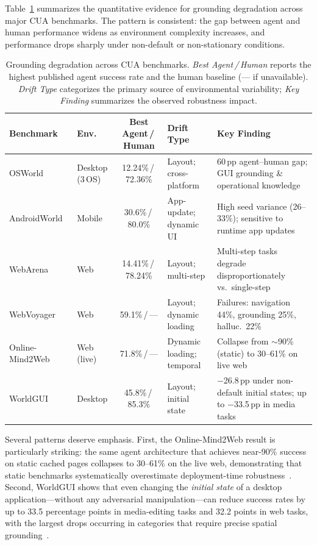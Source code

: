 Table~\ref{tab:grounding-degradation} summarizes the quantitative evidence for grounding degradation across major CUA benchmarks. The pattern is consistent: the gap between agent and human performance widens as environment complexity increases, and performance drops sharply under non-default or non-stationary conditions.

\begin{table}[!ht]
\caption{Grounding degradation across CUA benchmarks. \emph{Best Agent\,/\,Human} reports the highest published agent success rate and the human baseline (--- if unavailable). \emph{Drift Type} categorizes the primary source of environmental variability; \emph{Key Finding} summarizes the observed robustness impact.}
\label{tab:grounding-degradation}
\centering
\footnotesize
\setlength{\tabcolsep}{4pt}
\begin{tabular}{p{2.4cm} p{1.3cm} c p{1.8cm} p{3.8cm}}
\toprule
\textbf{Benchmark} & \textbf{Env.} & \textbf{Best Agent\,/\,Human} & \textbf{Drift Type} & \textbf{Key Finding} \\
\midrule
OSWorld~\cite{osworld2024}
  & Desktop (3\,OS)
  & 12.24\%\,/\,72.36\%
  & Layout; cross-platform
  & 60\,pp agent--human gap; GUI grounding \& operational knowledge \\
\midrule
AndroidWorld~\cite{androidworld2024}
  & Mobile
  & 30.6\%\,/\,80.0\%
  & App-update; dynamic UI
  & High seed variance (26--33\%); sensitive to runtime app updates \\
\midrule
WebArena~\cite{webarena2023}
  & Web
  & 14.41\%\,/\,78.24\%
  & Layout; multi-step
  & Multi-step tasks degrade disproportionately vs.\ single-step \\
\midrule
WebVoyager~\cite{webvoyager2024}
  & Web
  & 59.1\%\,/\,---
  & Layout; dynamic loading
  & Failures: navigation 44\%, grounding 25\%, halluc.\ 22\% \\
\midrule
Online-Mind2Web~\cite{onlinemind2web2025}
  & Web (live)
  & 71.8\%\,/\,---
  & Dynamic loading; temporal
  & Collapse from ${\sim}$90\% (static) to 30--61\% on live web \\
\midrule
WorldGUI~\cite{worldgui2025}
  & Desktop
  & 45.8\%\,/\,85.3\%
  & Layout; initial state
  & $-$26.8\,pp under non-default initial states; up to $-$33.5\,pp in media tasks \\
\bottomrule
\end{tabular}
\end{table}

Several patterns deserve emphasis. First, the Online-Mind2Web result is particularly striking: the same agent architecture that achieves near-90\% success on static cached pages collapses to 30--61\% on the live web, demonstrating that static benchmarks systematically overestimate deployment-time robustness~\cite{onlinemind2web2025}. Second, WorldGUI shows that even changing the \emph{initial state} of a desktop application---without any adversarial manipulation---can reduce success rates by up to 33.5 percentage points in media-editing tasks and 32.2 points in web tasks, with the largest drops occurring in categories that require precise spatial grounding~\cite{worldgui2025}.

